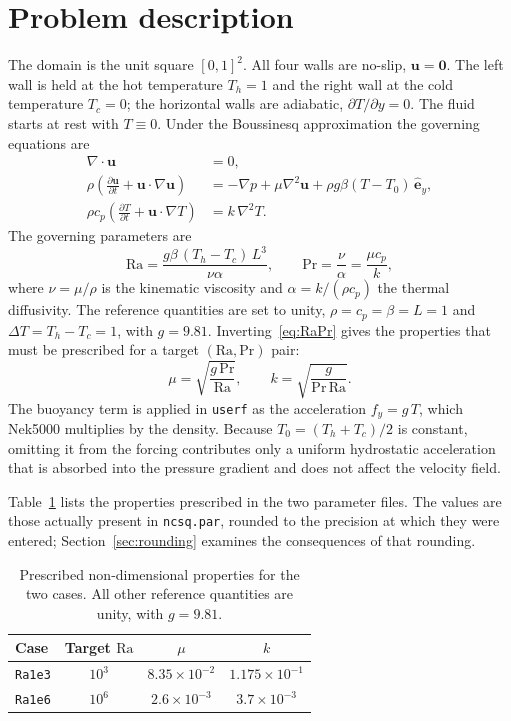 \documentclass[11pt,a4paper]{article}
\begin{document}
\section{Problem description}
The domain is the unit square $[0,1]^{2}$. All four walls are no-slip,
$\mathbf{u}=\mathbf{0}$. The left wall is held at the hot temperature
$T_h=1$ and the right wall at the cold temperature $T_c=0$; the horizontal
walls are adiabatic, $\partial T/\partial y=0$. The fluid starts at rest with
$T\equiv0$. Under the Boussinesq approximation the governing equations are
\begin{align}
\nabla\cdot\mathbf{u} &= 0,\\
\rho\left(\frac{\partial\mathbf{u}}{\partial t}
  + \mathbf{u}\cdot\nabla\mathbf{u}\right)
  &= -\nabla p + \mu\nabla^{2}\mathbf{u} + \rho g \beta (T-T_0)\,\hat{\mathbf{e}}_y,\\
\rho c_p\left(\frac{\partial T}{\partial t}
  + \mathbf{u}\cdot\nabla T\right) &= k\,\nabla^{2}T .
\end{align}
The governing parameters are
\begin{equation}
\mathrm{Ra} = \frac{g\beta\,(T_h-T_c)\,L^{3}}{\nu\alpha},
\qquad
\mathrm{Pr} = \frac{\nu}{\alpha} = \frac{\mu c_p}{k},
\label{eq:RaPr}
\end{equation}
where $\nu=\mu/\rho$ is the kinematic viscosity and $\alpha = k/(\rho c_p)$ the
thermal diffusivity. The reference quantities are set to unity,
$\rho = c_p = \beta = L = 1$ and $\Delta T = T_h - T_c = 1$, with $g=9.81$.
Inverting~\eqref{eq:RaPr} gives the properties that must be prescribed for a
target $(\mathrm{Ra},\mathrm{Pr})$ pair:
\begin{equation}
\mu = \sqrt{\frac{g\,\mathrm{Pr}}{\mathrm{Ra}}},
\qquad
k = \sqrt{\frac{g}{\mathrm{Pr}\,\mathrm{Ra}}} .
\label{eq:props}
\end{equation}
The buoyancy term is applied in \texttt{userf} as the acceleration
$f_y = g\,T$, which Nek5000 multiplies by the density. Because
$T_0=(T_h+T_c)/2$ is constant, omitting it from the forcing contributes only a
uniform hydrostatic acceleration that is absorbed into the pressure gradient
and does not affect the velocity field.

Table~\ref{tab:params} lists the properties prescribed in the two parameter
files. The values are those actually present in \texttt{ncsq.par}, rounded to
the precision at which they were entered; Section~\ref{sec:rounding} examines
the consequences of that rounding.

\begin{table}[htbp]
\centering
\caption{Prescribed non-dimensional properties for the two cases. All other
reference quantities are unity, with $g=9.81$.}
\label{tab:params}
\begin{tabular}{lccc}
\toprule
Case & Target $\mathrm{Ra}$ & $\mu$ & $k$\\
\midrule
\texttt{Ra1e3} & $10^{3}$ & $8.35\times10^{-2}$ & $1.175\times10^{-1}$\\
\texttt{Ra1e6} & $10^{6}$ & $2.6\times10^{-3}$ & $3.7\times10^{-3}$\\
\bottomrule
\end{tabular}
\end{table}
\end{document}
